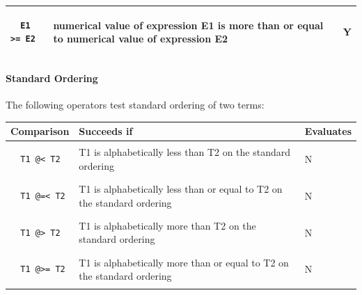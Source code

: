 \documentclass{article}
\begin{document}
\begin{multicols}{2}
\begin{tabular}{ | p{2cm} | p{4cm} | p{1.4cm} | }
  \begin{lstlisting}
  E1 >= E2
  \end{lstlisting} & numerical value of expression E1 is more than or equal to numerical value of expression E2 & Y \\
  \hline
  \end{tabular}
  
  \paragraph{Standard Ordering} The following operators test standard ordering of two terms:
  
  \noindent 
  \begin{tabular}{ | p{2cm} | p{4cm} | p{1.4cm} | }
  \hline
  \bf Comparison & \bf Succeeds if & \bf Evaluates \\
  \hline
  
  \begin{lstlisting}
  T1 @< T2
  \end{lstlisting} & T1 is alphabetically less than T2 on the standard ordering & N \\
  \hline
  
  \begin{lstlisting}
  T1 @=< T2
  \end{lstlisting} & T1 is alphabetically less than or equal to T2 on the standard ordering & N \\
  \hline
  
  \begin{lstlisting}
  T1 @> T2
  \end{lstlisting} & T1 is alphabetically more than T2 on the standard ordering & N \\
  \hline
  
  \begin{lstlisting}
  T1 @>= T2
  \end{lstlisting} & T1 is alphabetically more than or equal to T2 on the standard ordering & N \\
  \hline
  
  \end{tabular}

  \end{multicols}
\end{document}

